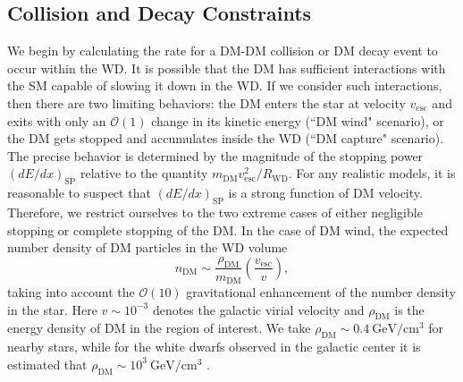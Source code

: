 \documentclass[twocolumn,preprintnumbers,amsmath,amssymb,prl, superscriptaddress]{revtex4}
\newcommand{\OO}{\mathcal{O}}
\newcommand{\GeV}{\text{GeV}}
\def\r{\right)}
\def\l{\left(}
\begin{document}
\subsection{Collision and Decay Constraints}
\label{sec:CollisionConstraints}

We begin by calculating the rate for a DM-DM collision or DM decay event to occur within the WD.
It is possible that the DM has sufficient interactions with the SM capable of slowing it down in the WD.
If we consider such interactions, then there are two limiting behaviors: the DM enters the star at velocity $v_\text{esc}$ and exits with only an $\OO(1)$ change in its kinetic energy (``DM wind" scenario), or the DM gets stopped and accumulates inside the WD (``DM capture" scenario).
The precise behavior is determined by the magnitude of the stopping power $(dE/dx)_\text{SP}$ relative to the quantity $m_\text{DM} v_\text{esc}^2/R_\text{WD}$.
For any realistic models, it is reasonable to suspect that $(dE/dx)_\text{SP}$ is a strong function of DM velocity.
Therefore, we restrict ourselves to the two extreme cases of either negligible stopping or complete stopping of the DM.
In the case of DM wind, the expected number density of DM particles in the WD volume
\begin{equation}
n_\text{DM} \sim \frac{\rho_{\text{DM}}}{m_\text{DM}} \l \frac{v_\text{esc}}{v}\r,
\end{equation}
taking into account the $\OO(10)$ gravitational enhancement of the number density in the star.
Here $v \sim 10^{-3}$ denotes the galactic virial velocity and $\rho_\text{DM}$ is the energy density of DM in the region of interest.
We take $\rho_\text{DM} \sim 0.4 ~\GeV/\text{cm}^3$ for nearby stars, while for the white dwarfs observed in the galactic center it is estimated that $\rho_\text{DM} \sim 10^3 ~\text{GeV}/\text{cm}^3$ \cite{Nesti:2013uwa}.
\end{document}
